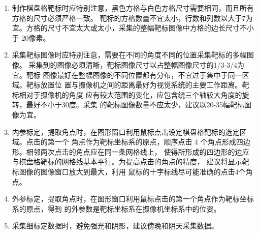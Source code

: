 \begin{enumerate}[\indent $1)$]
\item 制作棋盘格靶标时应特别注意，黑色方格与白色方格尺寸需要相同，而且所有方格的尺寸必须严格一致。
靶标的方格数量不宜太小，行数和列数以大于7为宜。方格的尺寸不宜太大或太小，采集的整幅靶标图像中方格的边长尺寸不小于
20像素。
\item 采集靶标图像时应特别注意，需要在不同的角度不同的位置采集靶标的多幅图像。
采集到的图像必须清晰，靶标图像尺寸以占整幅图像尺寸的1/3-3/4为宜。靶标
图像最好在整幅图像的不同位置都有分布，不宜过于集中于同一区域。靶标放置位
置与摄像机之间的距离最好为视觉系统的主要工作距离。靶标相对于摄像机的角度
应有较大范围的变化，应包含绕三个轴较大角度的旋转，最好不小于30度。采集
的靶标图像数量不应太少，建议以20-35幅靶标图像为宜。
\item 内参标定，提取角点时，在图形窗口利用鼠标点击设定棋盘格靶标的选定区域。点击的第一个
角点作为靶标坐标系的原点，顺序点击 4 个角点形成四边形。相邻两次点击的角点应在同一条网格线上，
使得所形成的四边形的边应与棋盘格靶标的网格线基本平行。为提高点击的角点的精度，
建议将显示靶标图像的图像窗口放大到最大，利用
鼠标的十字标线尽可能准确的点击4个角点。
\item 外参标定，提取角点时，在图形窗口利用鼠标点击的第一个角点作为靶标坐标系的原点，得到
的外参数是靶标坐标系在摄像机坐标系中的位姿。
\item 采集细标定数据时，避免强光和阴影，建议傍晚和阴天采集数据。
\end{enumerate}
